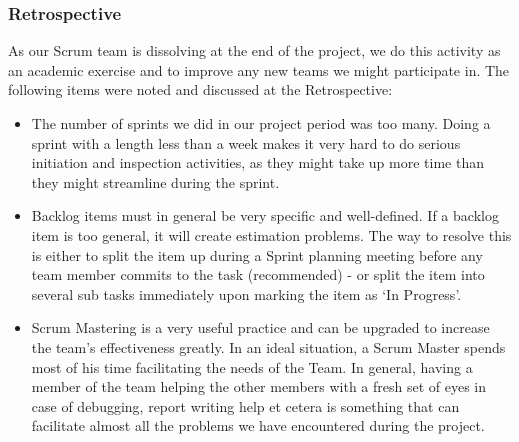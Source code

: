 \subsubsection{Retrospective}
As our Scrum team is dissolving at the end of the project, we do this activity as an academic exercise and to improve any new teams we might participate in. The following items were noted and discussed at the Retrospective:
\begin{itemize}
\item The number of sprints we did in our project period was too many. Doing a sprint with a length less than a week makes it very hard to do serious initiation and inspection activities, as they might take up more time than they might streamline during the sprint.
\item Backlog items must in general be very specific and well-defined. If a backlog item is too general, it will create estimation problems. The way to resolve this is either to split the item up during a Sprint planning meeting before any team member commits to the task (recommended) - or split the item into several sub tasks immediately upon marking the item as `In Progress'.
\item Scrum Mastering is a very useful practice and can be upgraded to increase the team's effectiveness greatly. In an ideal situation, a Scrum Master spends most of his time facilitating the needs of the Team. In general, having a member of the team helping the other members with a fresh set of eyes in case of debugging, report writing help et cetera is something that can facilitate almost all the problems we have encountered during the project.
\end{itemize}
\newpage